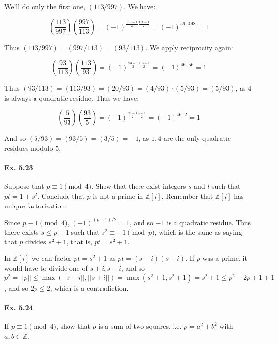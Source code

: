 \documentclass[notitlepage]{article}
\theoremstyle{definition}
\newcommand\Z{\mathbb{Z}}
\begin{document}
We'll do only the first one, $(113/997)$. We have:

\begin{equation}
  \left(\frac{113}{997}\right)\left(\frac{997}{113}\right) =
  (-1)^{\frac{113-1}{2}\frac{997-1}{2}} = (-1)^{56 \cdot 498} = 1
\end{equation}

Thus $(113/997) = (997/113) = (93/113)$. We apply reciprocity again:

\begin{equation}
  \left(\frac{93}{113}\right)\left(\frac{113}{93}\right) =
  (-1)^{\frac{93-1}{2}\frac{113-1}{2}} = (-1)^{46 \cdot 56} = 1
\end{equation}

Thus $(93/113) = (113/93) = (20/93) = (4/93)\cdot(5/93) = (5/93)$, as
$4$ is always a quadratic residue. Thus we have:

\begin{equation}
  \left(\frac{5}{93}\right)\left(\frac{93}{5}\right) =
  (-1)^{\frac{93-1}{2}\frac{5-1}{2}} = (-1)^{46 \cdot 2} = 1
\end{equation}

And so $(5/93) = (93/5) = (3/5) = -1$, as $1, 4$ are the only
quadratic residues modulo $5$.

\paragraph{Ex. 5.23}
Suppose that $p \equiv 1 \pmod 4$. Show that there exist integers $s$
and $t$ such that $pt = 1 + s^2$.  Conclude that $p$ is not a prime in
$\Z[i]$. Remember that $\Z[i]$ has unique factorization.

Since $p \equiv 1 \pmod 4$, $(-1)^{(p-1)/2} = 1$, and so $-1$ is a
quadratic residue. Thus there exists $s \leq p-1$ such that $s^2
\equiv -1 \pmod p$, which is the same as saying that $p$ divides $s^2
+ 1$, that is, $pt = s^2 + 1$.

In $\Z[i]$ we can factor $pt = s^2 + 1$ as $pt = (s-i)(s+i)$. If $p$
was a prime, it would have to divide one of $s+i, s-i$, and so $p^2 =
||p|| \leq \max(||s-i||, ||s+i||) = \max(s^2 + 1, s^2 + 1) = s^2 + 1
\leq p^2 - 2p + 1 + 1$, and so $2p \leq 2$, which is a contradiction.

\paragraph{Ex. 5.24}
If $p \equiv 1 \pmod 4$, show that $p$ is a sum of two squares,
i.e. $p = a^2 + b^2$ with $a, b \in \Z$.
\end{document}

